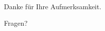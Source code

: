 \documentclass[ignorenonframetext]{beamer}
\newcommand{\mybreak}{\par\vspace*{\baselineskip}}
\begin{document}
\begin{frame}[fragile]
{\begin{center}
			\end{center}}
		\end{frame}

	
%
\begin{frame}
\begin{center}
	Danke für Ihre Aufmerksamkeit.\mybreak
	Fragen?
\end{center}	
\end{frame}
\end{document}
